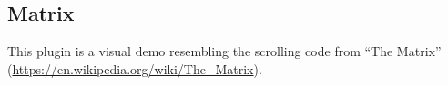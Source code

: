 \subsection{Matrix}

This plugin is a visual demo resembling the scrolling code from ``The Matrix''
(\url{https://en.wikipedia.org/wiki/The_Matrix}).
